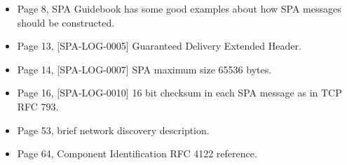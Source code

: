 \begin{itemize}
    \item Page 8, SPA Guidebook has some good examples about how SPA messages
        should be constructed.
    \item Page 13, [SPA-LOG-0005] Guaranteed Delivery Extended Header.
    \item Page 14, [SPA-LOG-0007] SPA maximum size 65536 bytes.
    \item Page 16, [SPA-LOG-0010] 16 bit checksum in each SPA message as in TCP
        RFC 793.
    \item Page 53, brief network discovery description.
    \item Page 64, Component Identification RFC 4122 reference.
\end{itemize}
%
%
%
%
